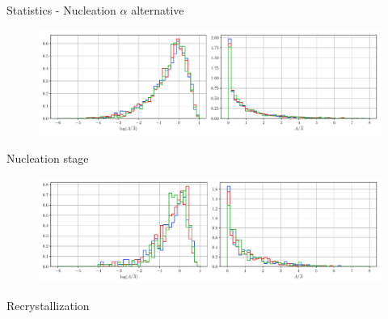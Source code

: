 \documentclass[usenames,dvipsnames]{beamer}
\begin{document}
\begin{frame}{Statistics - Nucleation $\alpha$ alternative}
\small
\centering
    \vspace{-0.5em}
    \begin{figure}
        \centering
        \includegraphics[scale=0.35]{figures/stored_energy/SE/areas/000110_nuclalternative_set.pdf}
    \end{figure}
    \vspace{-1em}
    Nucleation stage
    \begin{figure}
        \centering
        \includegraphics[scale=0.35]{figures/stored_energy/SE/areas/000240_nuclalternative_set.pdf}
    \end{figure}
    \vspace{-1em}
    Recrystallization
\end{frame}
\end{document}
